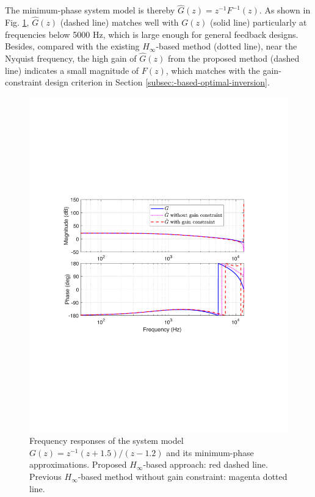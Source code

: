 \documentclass [11pt, proquest] {uwthesis}[2020/02/24]
\begin{document}
The minimum-phase system model is thereby $\hat{G}(z)=z^{-1}F^{-1}(z)$.
As shown in Fig. \ref{fig:Optimal-inverse-design}, $\hat{G}(z)$
(dashed line) matches well with $G(z)$ (solid line) particularly
at frequencies below 5000 Hz, which is large enough for general feedback
designs. Besides, compared with the existing $H_{\infty}$-based
method (dotted line), near the Nyquist frequency, the high gain of
$\hat{G}(z)$ from the proposed method (dashed line) indicates a small
magnitude of $F(z)$, which matches with the gain-constraint design
criterion in Section \ref{subsec:-based-optimal-inversion}.
\begin{figure}[!ht]
\begin{centering}
\includegraphics[width=13cm]{Model-inversion/unstable_plant}
\par\end{centering}
\caption{\label{fig:Optimal-inverse-design}Frequency responses of the system
model $G(z)=z^{-1}(z+1.5)/(z-1.2)$ and its minimum-phase approximations.
Proposed $H_{\infty}$-based approach: red dashed line. Previous $H_{\infty}$-based
method without gain constraint: magenta dotted line. }
\end{figure}
\end{document}
